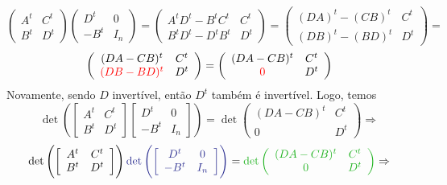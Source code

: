 \documentclass[11pt,a4paper]{article}
\begin{document}
{{               \[
   \left( \begin{array}{cc} A^t & C^t \\ B^t & D^t \end{array} \right)  \left( \begin{array}{cc} D^t & 0 \\ -B^t & I_n \end{array} \right) = \left( \begin{array}{cc} A^tD^t - B^tC^t & C^t \\ B^tD^t - D^tB^t & D^t \end{array} \right) = \left( \begin{array}{cc} (DA)^t - (CB)^t & C^t \\ (DB)^t - (BD)^t & D^t \end{array} \right) = \]\[\left( \begin{array}{cc} (DA - CB)^t & C^t \\ \textcolor{red}{(DB - BD)^t} & D^t \end{array} \right) = \left( \begin{array}{cc} (DA - CB)^t & C^t \\ \textcolor{red}{0} & D^t \end{array} \right) 
    \]
    Novamente, sendo $D$ invertível, então $D^t$ também é invertível. Logo, temos
                   \[
   \det\left( \left[\begin{array}{cc} A^t & C^t \\ B^t & D^t \end{array} \right]  \left[ \begin{array}{cc} D^t & 0 \\ -B^t & I_n \end{array} \right] \right) = \det \left( \begin{array}{cc} (DA - CB)^t & C^t \\ 0 & D^t \end{array} \right) \Rightarrow
    \]
    \[
       \det\left( \left[\begin{array}{cc} A^t & C^t \\ B^t & D^t \end{array} \right] \right) \textcolor{Blue}{\det \left( \left[ \begin{array}{cc} D^t & 0 \\ -B^t & I_n \end{array} \right] \right)} = \textcolor{Verde}{\det \left( \begin{array}{cc} (DA - CB)^t & C^t \\ 0 & D^t \end{array} \right)} \Rightarrow
\]}}
\end{document}
